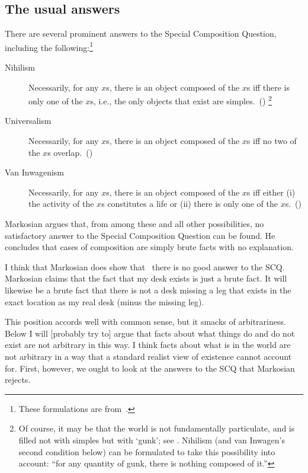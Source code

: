 \documentclass[11pt]{article}
\begin{document}
\begin{spacing}{1.5}
\subsection{The usual answers}
There are several prominent answers to the Special Composition Question, including the following:\footnote{These formulations are from~\citet{markosian1998a}.}
\begin{description}
	\item[Nihilism] Necessarily, for any $x$s, there is an object composed of the $x$s iff there is only one of the $x$s, i.e., the only objects that exist are simples.~(\citeyear[219]{markosian1998a})%
		\footnote{\label{gunk} Of course, it may be that the world is not fundamentally particulate, and is filled not with simples but with `gunk'; see \citet{schaffer2003}. Nihilism (and van Inwagen's second condition below) can be formulated to take this possibility into account: ``for any quantity of gunk, there is nothing composed of it.''}%
	\item[Universalism] Necessarily, for any $x$s, there is an object composed of the $x$s iff no two of the $x$s overlap.~(\citeyear[227]{markosian1998a})
	\item[Van Inwagenism] Necessarily, for any $x$s, there is an object composed of the $x$s iff either (i) the activity of the $x$s constitutes a life or (ii) there is only one of the $x$s.~(\citeyear[221]{markosian1998a})
\end{description}

Markosian argues that, from among these and all other possibilities, no satisfactory answer to the Special Composition Question can be found. He concludes that cases of composition are simply brute facts with no explanation.%

I think that Markosian does show that%
%
\ there is no good answer to the SCQ. Markosian claims that the fact that my desk exists is just a brute fact. It will likewise be a brute fact that there is not a desk missing a leg that exists in the exact location as my real desk (minus the missing leg).

This position accords well with common sense, but it smacks of arbitrariness. Below I will [probably try to] argue that facts about what things do and do not exist are not arbitrary in this way. I think facts about what is in the world are not arbitrary in a way that a standard realist view of existence cannot account for. First, however, we ought to look at the answers to the SCQ that Markosian rejects.


\end{spacing}
\end{document}
